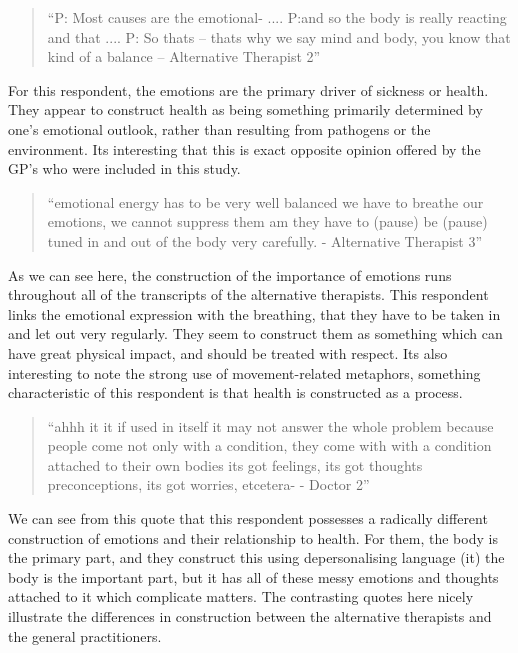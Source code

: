 \begin{quotation}
``P: Most causes are the emotional-
....
P:and so the body is really reacting and that
....
P: So thats – thats why we say mind and body, you know that kind of a balance – Alternative Therapist 2''  
\end{quotation}


For this respondent, the emotions are the primary driver of sickness or health. They appear to construct health as being something primarily determined by one's emotional outlook, rather than resulting from pathogens or the environment. Its interesting that this is exact opposite opinion offered by the GP's who were included in this study. 

\begin{quotation}
``emotional energy has to be very well balanced we have to breathe our emotions, we cannot suppress them am they have to (pause) be (pause) tuned in and out of the body very carefully. - Alternative Therapist 3''  
\end{quotation}



As we can see here, the construction of the importance of emotions runs throughout all of the transcripts of the alternative therapists. This respondent links the emotional expression with the breathing, that they have to be taken in and let out very regularly. They seem to construct them as something which can have great physical impact, and should be treated with respect. Its also interesting to note the strong use of movement-related metaphors, something characteristic of this respondent is that health is constructed as a process. 


\begin{quotation}
``ahhh it it if used in itself it may not answer the whole problem because people come not only with a condition, they come with with a condition attached to their own bodies its got feelings, its got thoughts preconceptions, its got worries, etcetera- - Doctor 2''  
\end{quotation}


We can see from this quote that this respondent possesses a radically different construction of emotions and their relationship to health. For them, the body is the primary part, and they construct this using depersonalising language (it) the body is the important part, but it has all of these messy emotions and thoughts attached to it which complicate matters. The contrasting quotes here nicely illustrate the differences in construction between the alternative therapists and the general practitioners. 


